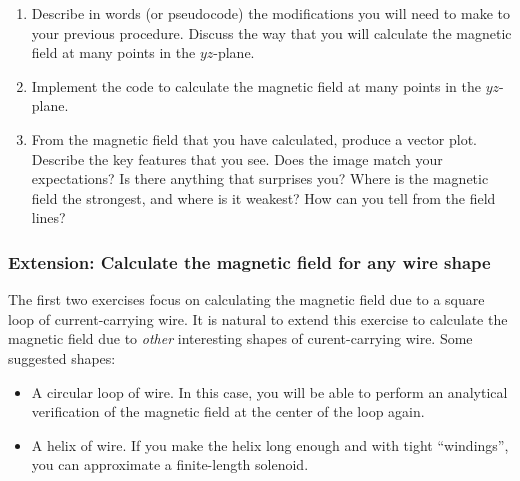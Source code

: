 \documentclass[]{article}
\providecommand{\tightlist}{%
  \setlength{\itemsep}{0pt}\setlength{\parskip}{0pt}}
\begin{document}
\begin{enumerate}
\def\labelenumi{\arabic{enumi}.}
\tightlist
\item
  Describe in words (or pseudocode) the modifications you will need to
  make to your previous procedure. Discuss the way that you will
  calculate the magnetic field at many points in the \(yz\)-plane.
\item
  Implement the code to calculate the magnetic field at many points in
  the \(yz\)-plane.
\item
  From the magnetic field that you have calculated, produce a vector
  plot. Describe the key features that you see. Does the image match
  your expectations? Is there anything that surprises you? Where is the
  magnetic field the strongest, and where is it weakest? How can you
  tell from the field lines?
\end{enumerate}

\subsubsection{Extension: Calculate the magnetic field for any wire
shape}\label{extension-calculate-the-magnetic-field-for-any-wire-shape}

The first two exercises focus on calculating the magnetic field due to a
square loop of current-carrying wire. It is natural to extend this
exercise to calculate the magnetic field due to \emph{other} interesting
shapes of curent-carrying wire. Some suggested shapes:

\begin{itemize}
\tightlist
\item
  A circular loop of wire. In this case, you will be able to perform an
  analytical verification of the magnetic field at the center of the
  loop again.\\
\item
  A helix of wire. If you make the helix long enough and with tight
  ``windings'', you can approximate a finite-length solenoid.
\end{itemize}
\end{document}
